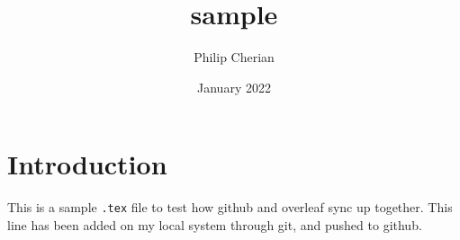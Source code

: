 \documentclass{article}
\title{sample}
\author{Philip Cherian}
\date{January 2022}
\begin{document}
\maketitle

\section{Introduction}

This is a sample \texttt{.tex} file to test how github and overleaf sync up together. This line has been added on my local system through git, and pushed to github.
\end{document}
